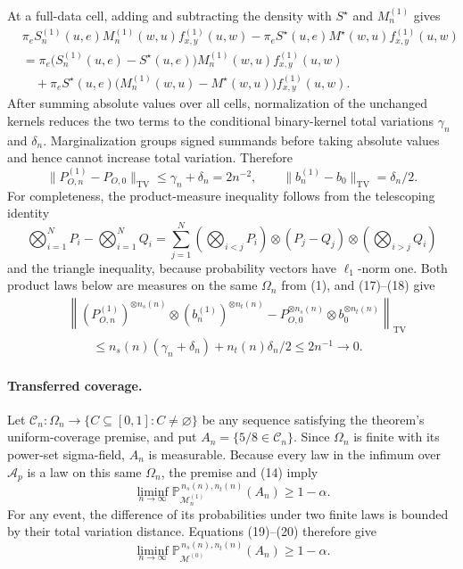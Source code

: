 At a full-data cell, adding and subtracting the density with \(S^{\star}\) and \(M^{(1)}_n\) gives
\[
\begin{aligned}
&\pi_eS^{(1)}_n(u,e)M^{(1)}_n(w,u)f^{(1)}_{x,y}(u,w)
-\pi_eS^{\star}(u,e)M^{\star}(w,u)f^{(1)}_{x,y}(u,w)\\
&=\pi_e\bigl(S^{(1)}_n(u,e)-S^{\star}(u,e)\bigr)
M^{(1)}_n(w,u)f^{(1)}_{x,y}(u,w)\\
&\quad+\pi_eS^{\star}(u,e)
\bigl(M^{(1)}_n(w,u)-M^{\star}(w,u)\bigr)
f^{(1)}_{x,y}(u,w).
\end{aligned}
\]
After summing absolute values over all cells, normalization of the unchanged kernels reduces the two terms to the conditional binary-kernel total variations \(\gamma_n\) and \(\delta_n\).  Marginalization groups signed summands before taking absolute values and hence cannot increase total variation.  Therefore
\[
\lVert P^{(1)}_{O,n}-P_{O,0}\rVert_{\mathrm{TV}}
\le\gamma_n+\delta_n=2n^{-2},
\qquad
\lVert b^{(1)}_n-b_0\rVert_{\mathrm{TV}}=\delta_n/2.
\tag{17}
\]
For completeness, the product-measure inequality follows from the telescoping identity
\[
\bigotimes_{i=1}^N P_i-\bigotimes_{i=1}^N Q_i
=\sum_{j=1}^N
\left(\bigotimes_{i<j}P_i\right)\otimes(P_j-Q_j)\otimes
\left(\bigotimes_{i>j}Q_i\right)
\tag{18}
\]
and the triangle inequality, because probability vectors have \(\ell_1\)-norm one.  Both product laws below are measures on the same \(\Omega_n\) from (1), and (17)--(18) give
\[
\begin{aligned}
&\left\lVert
(P^{(1)}_{O,n})^{\otimes n_s(n)}\otimes(b^{(1)}_n)^{\otimes n_t(n)}
-P_{O,0}^{\otimes n_s(n)}\otimes b_0^{\otimes n_t(n)}
\right\rVert_{\mathrm{TV}}\\
&\qquad\le n_s(n)(\gamma_n+\delta_n)+n_t(n)\delta_n/2
\le2n^{-1}\longrightarrow0.
\end{aligned}
\tag{19}
\]

\paragraph{Transferred coverage.}
Let \(\mathcal C_n:\Omega_n\to\{C\subseteq[0,1]:C\ne\varnothing\}\) be any sequence satisfying the theorem's uniform-coverage premise, and put \(A_n=\{5/8\in\mathcal C_n\}\).  Since \(\Omega_n\) is finite with its power-set sigma-field, \(A_n\) is measurable.  Because every law in the infimum over \(\mathcal A_p\) is a law on this same \(\Omega_n\), the premise and (14) imply
\[
\liminf_{n\to\infty}
\mathbb P_{\mathcal M^{(1)}_n}^{\,n_s(n),n_t(n)}(A_n)
\ge1-\alpha.
\tag{20}
\]
For any event, the difference of its probabilities under two finite laws is bounded by their total variation distance.  Equations (19)--(20) therefore give
\[
\liminf_{n\to\infty}
\mathbb P_{\mathcal M^{(0)}}^{\,n_s(n),n_t(n)}(A_n)
\ge1-\alpha.
\tag{21}
\]

